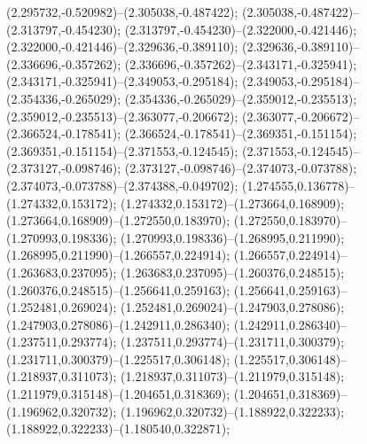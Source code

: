  (2.295732,-0.520982)--(2.305038,-0.487422);
 (2.305038,-0.487422)--(2.313797,-0.454230);
 (2.313797,-0.454230)--(2.322000,-0.421446);
 (2.322000,-0.421446)--(2.329636,-0.389110);
 (2.329636,-0.389110)--(2.336696,-0.357262);
 (2.336696,-0.357262)--(2.343171,-0.325941);
 (2.343171,-0.325941)--(2.349053,-0.295184);
 (2.349053,-0.295184)--(2.354336,-0.265029);
 (2.354336,-0.265029)--(2.359012,-0.235513);
 (2.359012,-0.235513)--(2.363077,-0.206672);
 (2.363077,-0.206672)--(2.366524,-0.178541);
 (2.366524,-0.178541)--(2.369351,-0.151154);
 (2.369351,-0.151154)--(2.371553,-0.124545);
 (2.371553,-0.124545)--(2.373127,-0.098746);
 (2.373127,-0.098746)--(2.374073,-0.073788);
 (2.374073,-0.073788)--(2.374388,-0.049702);
 (1.274555,0.136778)--(1.274332,0.153172);
 (1.274332,0.153172)--(1.273664,0.168909);
 (1.273664,0.168909)--(1.272550,0.183970);
 (1.272550,0.183970)--(1.270993,0.198336);
 (1.270993,0.198336)--(1.268995,0.211990);
 (1.268995,0.211990)--(1.266557,0.224914);
 (1.266557,0.224914)--(1.263683,0.237095);
 (1.263683,0.237095)--(1.260376,0.248515);
 (1.260376,0.248515)--(1.256641,0.259163);
 (1.256641,0.259163)--(1.252481,0.269024);
 (1.252481,0.269024)--(1.247903,0.278086);
 (1.247903,0.278086)--(1.242911,0.286340);
 (1.242911,0.286340)--(1.237511,0.293774);
 (1.237511,0.293774)--(1.231711,0.300379);
 (1.231711,0.300379)--(1.225517,0.306148);
 (1.225517,0.306148)--(1.218937,0.311073);
 (1.218937,0.311073)--(1.211979,0.315148);
 (1.211979,0.315148)--(1.204651,0.318369);
 (1.204651,0.318369)--(1.196962,0.320732);
 (1.196962,0.320732)--(1.188922,0.322233);
 (1.188922,0.322233)--(1.180540,0.322871);

